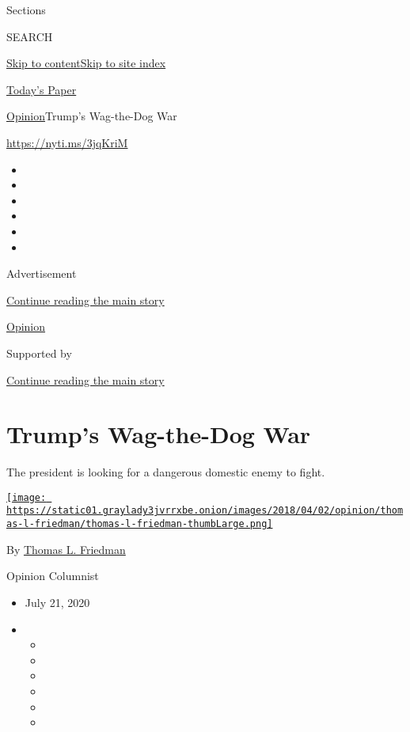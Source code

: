 Sections

SEARCH

\protect\hyperlink{site-content}{Skip to
content}\protect\hyperlink{site-index}{Skip to site index}

\href{https://myaccount.nytimes3xbfgragh.onion/auth/login?response_type=cookie\&client_id=vi}{}

\href{https://www.nytimes3xbfgragh.onion/section/todayspaper}{Today's
Paper}

\href{/section/opinion}{Opinion}\textbar{}Trump's Wag-the-Dog War

\url{https://nyti.ms/3jqKriM}

\begin{itemize}
\item
\item
\item
\item
\item
\item
\end{itemize}

Advertisement

\protect\hyperlink{after-top}{Continue reading the main story}

\href{/section/opinion}{Opinion}

Supported by

\protect\hyperlink{after-sponsor}{Continue reading the main story}

\hypertarget{trumps-wag-the-dog-war}{%
\section{Trump's Wag-the-Dog War}\label{trumps-wag-the-dog-war}}

The president is looking for a dangerous domestic enemy to fight.

\href{https://www.nytimes3xbfgragh.onion/by/thomas-l-friedman}{\texttt{[image: https://static01.graylady3jvrrxbe.onion/images/2018/04/02/opinion/thomas-l-friedman/thomas-l-friedman-thumbLarge.png]}}

By \href{https://www.nytimes3xbfgragh.onion/by/thomas-l-friedman}{Thomas
L. Friedman}

Opinion Columnist

\begin{itemize}
\item
  July 21, 2020
\item
  \begin{itemize}
  \item
  \item
  \item
  \item
  \item
  \item
  \end{itemize}
\end{itemize}

